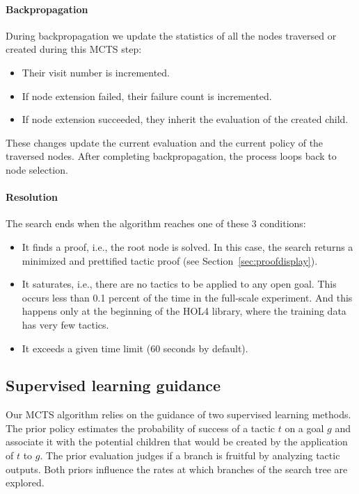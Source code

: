 \documentclass[runningheads,a4paper,draft]{svjour3}
\def\holfour{\textsf{HOL4}\xspace}
\begin{document}
\paragraph{Backpropagation}
During backpropagation we update the statistics of all the nodes traversed or
created during this MCTS step:
\begin{itemize}
\item Their visit number is incremented.
\item If node extension failed, their failure count is incremented.
\item If node extension succeeded, they inherit the evaluation of the created
child.
\end{itemize}

These changes update the current evaluation and the current policy of the
traversed nodes.
After completing backpropagation, the process loops back to node
selection.

\paragraph{Resolution}
The search ends when the algorithm reaches one of these 3 conditions:
\begin{itemize}
\item It finds a proof, i.e., the root node is solved. In this case,
the search returns a minimized and
prettified tactic proof (see Section~\ref{sec:proofdisplay}).
\item It saturates, i.e., there are no tactics to be applied to any open goal.
This occurs less than 0.1 percent of the time in the full-scale experiment.
And this happens only at the beginning of the \holfour library, where the
training
data
has very few tactics.
\item It exceeds a given time limit (60 seconds by default).
\end{itemize}

\subsection{Supervised learning guidance}
Our MCTS algorithm relies on the guidance of two supervised learning methods.
The prior policy estimates the probability of success of a tactic $t$ on a
goal $g$ and associate it with the potential children that would be created by
the
application of $t$ to $g$. The prior evaluation judges if a branch is fruitful
by analyzing tactic
outputs. Both priors influence the rates at which branches of the search tree
are explored.
\end{document}
